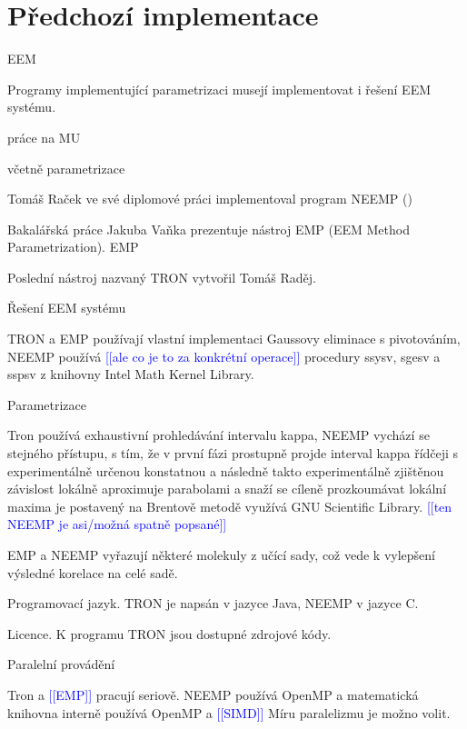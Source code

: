 \documentclass[
  color, %
  table, %
  lof,   %
  lot,   %
]{fithesis3}
\newcommand\todo[1]{\textcolor{blue}{[[#1]]}}
\begin{document}







\chapter{Předchozí implementace}
EEM

Programy implementující parametrizaci musejí implementovat i řešení EEM systému.

práce na MU

včetně parametrizace

Tomáš Raček ve své diplomové práci implementoval program NEEMP ()

Bakalářská práce Jakuba Vaňka prezentuje nástroj EMP (EEM Method Parametrization). EMP 

Poslední nástroj nazvaný TRON vytvořil Tomáš Raděj.

Řešení EEM systému

TRON a EMP používají vlastní implementaci Gaussovy eliminace s pivotováním, NEEMP používá \todo{ale co je to za konkrétní operace} procedury ssysv, sgesv a sspsv  z knihovny Intel Math Kernel Library.

Parametrizace

Tron používá exhaustivní prohledávání intervalu kappa, NEEMP vychází se stejného přístupu, s tím, že v první fázi prostupně projde interval kappa řídčeji s experimentálně určenou konstatnou a následně takto experimentálně zjištěnou závislost lokálně aproximuje parabolami a snaží se cíleně prozkoumávat lokální maxima je postavený na Brentově metodě využívá GNU Scientific Library. \todo{ten NEEMP je asi/možná spatně popsané}

EMP a NEEMP vyřazují některé molekuly z učící sady, což vede k vylepšení výsledné korelace na celé sadě.

Programovací jazyk. TRON je napsán v jazyce Java, NEEMP v jazyce C.

Licence. K programu TRON jsou dostupné zdrojové kódy.

Paralelní provádění

Tron a \todo{EMP} pracují seriově. NEEMP používá OpenMP a matematická knihovna interně používá OpenMP a \todo{SIMD} Míru paralelizmu je možno volit.
\end{document}

